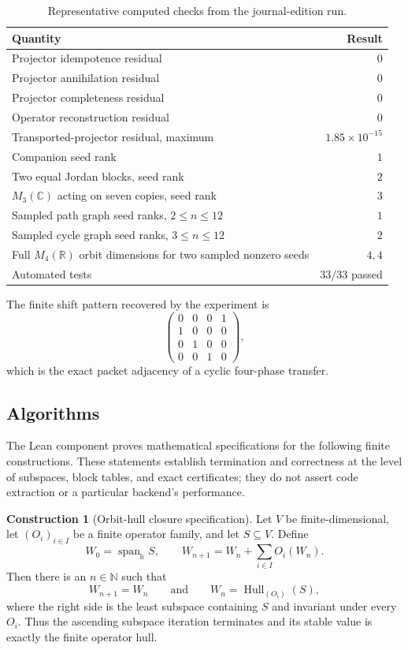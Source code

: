 \documentclass[11pt]{article}
\theoremstyle{definition}
\newtheorem{construction}[theorem]{Construction}
\theoremstyle{remark}
\newcommand{\Hull}{\operatorname{Hull}}
\newcommand{\Span}{\operatorname{span}}
\newcommand{\bbk}{\mathbb{k}}
\newcommand{\N}{\mathbb N}
\newcommand{\C}{\mathbb C}
\newcommand{\R}{\mathbb R}
\begin{document}
\begin{table}[htbp]
\centering
\caption{Representative computed checks from the journal-edition run.}
\label{tab:results}
\begin{tabular}{L{0.57\textwidth}r}
\toprule
Quantity & Result \\
\midrule
Projector idempotence residual & $0$ \\
Projector annihilation residual & $0$ \\
Projector completeness residual & $0$ \\
Operator reconstruction residual & $0$ \\
Transported-projector residual, maximum & $1.85\times10^{-15}$ \\
Companion seed rank & $1$ \\
Two equal Jordan blocks, seed rank & $2$ \\
$M_3(\C)$ acting on seven copies, seed rank & $3$ \\
Sampled path graph seed ranks, $2\le n\le12$ & $1$ \\
Sampled cycle graph seed ranks, $3\le n\le12$ & $2$ \\
Full $M_4(\R)$ orbit dimensions for two sampled nonzero seeds & $4,4$ \\
Automated tests & $33/33$ passed \\
\bottomrule
\end{tabular}
\end{table}

The finite shift pattern recovered by the experiment is
\[
\begin{pmatrix}
0&0&0&1\\
1&0&0&0\\
0&1&0&0\\
0&0&1&0
\end{pmatrix},
\]
which is the exact packet adjacency of a cyclic four-phase transfer.

\subsection{Algorithms}

The Lean component proves mathematical specifications for the following
finite constructions.  These statements establish termination and
correctness at the level of subspaces, block tables, and exact certificates;
they do not assert code extraction or a particular backend's performance.

\begin{construction}[Orbit-hull closure specification]
\label{con:orbit-hull-algorithm}
Let $V$ be finite-dimensional, let $(O_i)_{i\in I}$ be a finite operator
family, and let $S\subseteq V$.  Define
\[
W_0=\Span_{\bbk}S,
\qquad
W_{n+1}=W_n+\sum_{i\in I}O_i(W_n).
\]
Then there is an $n\in\N$ such that
\[
W_{n+1}=W_n
\qquad\text{and}\qquad
W_n=\Hull_{(O_i)}(S),
\]
where the right side is the least subspace containing $S$ and invariant under
every $O_i$.  Thus the ascending subspace iteration terminates and its stable
value is exactly the finite operator hull.
\end{construction}
\end{document}
